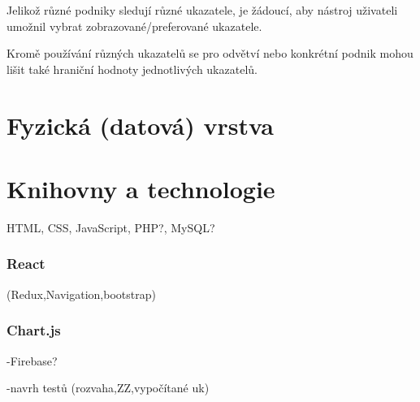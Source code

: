 Jelikož různé podniky sledují různé ukazatele, je žádoucí, aby nástroj uživateli umožnil vybrat zobrazované/preferované ukazatele. 

Kromě používání různých ukazatelů se pro odvětví nebo konkrétní podnik mohou lišit také hraniční hodnoty jednotlivých ukazatelů.

\section{Fyzická (datová) vrstva}

\section{Knihovny a technologie}
HTML, CSS, JavaScript, PHP?, MySQL?
\subsubsection{React}
(Redux,Navigation,bootstrap)

\subsubsection{Chart.js}



-Firebase?

-navrh testů (rozvaha,ZZ,vypočítané uk)